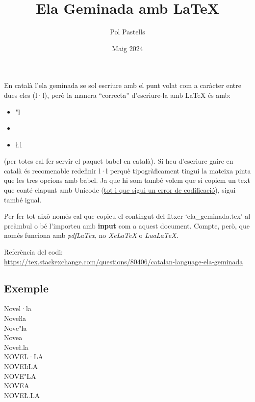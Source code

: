 \documentclass{article}
\title{Ela Geminada amb \LaTeX}
\date{Maig 2024}
\author{Pol Pastells}
\begin{document}
\maketitle

En català l'ela geminada se sol escriure amb el punt volat com a caràcter entre dues eles (l·l), però la manera ``correcta'' d'escriure-la amb \LaTeX{} és amb:
\begin{itemize}
    \item "l 
    \item \lgem{}
    \item \l.l
\end{itemize}
(per totes cal fer servir el paquet babel en català). Si heu d'escriure gaire en català és recomenable redefinir l·l perquè tipogràficament tingui la mateixa pinta que les tres opcions amb babel.
Ja que hi som també volem que si copiem un text que conté elapunt amb Unicode (\href{http://www.l·l.cat/info/formes-erronies-descriure-la-ela-geminada}{tot i que sigui un error de codificació}), sigui també igual.

Per fer tot això només cal que copieu el contingut del fitxer `ela\_geminada.tex' al preàmbul o bé l'importeu amb \textbf{input} com a aquest document.
Compte, però, que només funciona amb \textit{pdfLaTex}, no \textit{XeLaTeX} o \textit{LuaLaTeX}.

Referència del codi:\\
\url{https://tex.stackexchange.com/questions/80406/catalan-language-ela-geminada}

\subsection*{Exemple}
Novel·la \\
Noveŀla \\
Nove"la \\
Nove\lgem a \\
Nove\l.la \\
NOVEL·LA \\
NOVEĿLA \\
NOVE"LA \\
NOVE\Lgem A \\
NOVE\L.LA
\end{document}
